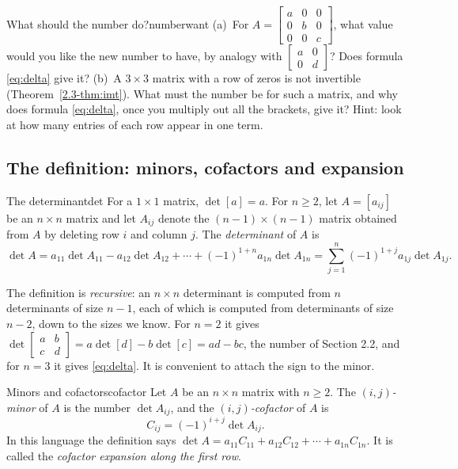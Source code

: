 \documentclass[11pt]{article}
\begin{document}
\begin{think}{What should the number do?}{numberwant}
(a)~For $A=\begin{bmatrix}a&0&0\\0&b&0\\0&0&c\end{bmatrix}$, what value would you like the new number to have, by analogy with $\begin{bmatrix}a&0\\0&d\end{bmatrix}$? Does formula \eqref{eq:delta} give it? (b)~A $3\times3$ matrix with a row of zeros is not invertible (Theorem~\ref{2.3-thm:imt}). What must the number be for such a matrix, and why does formula \eqref{eq:delta}, once you multiply out all the brackets, give it? Hint: look at how many entries of each row appear in one term.
\end{think}

\subsection*{The definition: minors, cofactors and expansion}

\begin{defn}{The determinant}{det}
For a $1\times1$ matrix, $\det[a]=a$. For $n\geq2$, let $A=[a_{ij}]$ be an $n\times n$ matrix and let $A_{ij}$ denote the $(n-1)\times(n-1)$ matrix obtained from $A$ by deleting row $i$ and column $j$. The \emph{determinant} of $A$ is
\[
\det A=a_{11}\det A_{11}-a_{12}\det A_{12}+\cdots+(-1)^{1+n}a_{1n}\det A_{1n}=\sum_{j=1}^{n}(-1)^{1+j}a_{1j}\det A_{1j}.
\]
\end{defn}

The definition is \emph{recursive}: an $n\times n$ determinant is computed from $n$ determinants of size $n-1$, each of which is computed from determinants of size $n-2$, down to the sizes we know. For $n=2$ it gives $\det\begin{bmatrix}a&b\\c&d\end{bmatrix}=a\det[d]-b\det[c]=ad-bc$, the number of Section 2.2, and for $n=3$ it gives \eqref{eq:delta}. It is convenient to attach the sign to the minor.

\begin{defn}{Minors and cofactors}{cofactor}
Let $A$ be an $n\times n$ matrix with $n\geq2$. The \emph{$(i,j)$-minor} of $A$ is the number $\det A_{ij}$, and the \emph{$(i,j)$-cofactor} of $A$ is
\[
C_{ij}=(-1)^{i+j}\det A_{ij}.
\]
In this language the definition says $\det A=a_{11}C_{11}+a_{12}C_{12}+\cdots+a_{1n}C_{1n}$. It is called the \emph{cofactor expansion along the first row}.
\end{defn}
\end{document}
